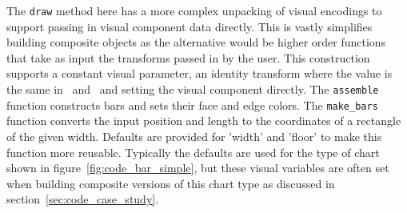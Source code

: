 \documentclass[../main.tex]{subfiles}
\begin{document}
The \texttt{draw} method here has a more complex unpacking of visual encodings to support passing in visual component data directly. This is vastly simplifies building composite objects as the alternative would be higher order functions that take as input the transforms passed in by the user. This construction supports a constant visual parameter, an identity transform where the value is the same in \dtotal\ and \vtotal\, and setting the visual component directly. The \texttt{assemble} function constructs bars and sets their face and edge colors. The \texttt{make_bars} function converts the input position and length to the coordinates of a rectangle of the given width. Defaults are provided for 'width' and 'floor' to make this function more reusable. Typically the defaults are used for the type of chart shown in figure~\ref{fig:code_bar_simple}, but these visual variables are often set when building composite versions of this chart type as discussed in section~\ref{sec:code_case_study}. 
\end{document}
